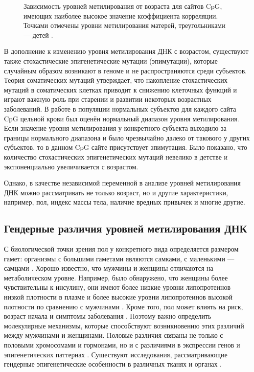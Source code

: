 \begin{figure}[ht]
	\caption{Зависимость уровней метилирования от возраста для сайтов CpG, имеющих наиболее высокое значение коэффициента корреляции. Точками отмечены уровни метилирования матерей, треугольниками --- детей \autocite{Garagnani2012}.}\label{fig:ELOVL2}
\end{figure}

В дополнение к изменению уровня метилирования ДНК с возрастом, существуют также стохастические эпигенетические мутации (эпимутации), которые случайным образом возникают в геноме и не распространяются среди субъектов. Теория соматических мутаций утверждает, что накопление стохастических мутаций в соматических клетках приводит к снижению клеточных функций \autocite{Kennedy2012} и играют важную роль при старении и развитии некоторых возрастных заболеваний. В работе \autocite{Gentilini2015} в популяции нормальных субъектов для каждого сайта CpG цельной крови был оценён нормальный диапазон уровня метилирования. Если значение уровня метилирования у конкретного субъекта выходило за границы нормального диапазона и было чрезвычайно далеко от такового у других субъектов, то в данном CpG сайте присутствует эпимутация. Было показано, что количество стохастических эпигенетических мутаций невелико в детстве и экспоненциально увеличивается с возрастом. 

Однако, в качестве независимой переменной в анализе уровней метилирования ДНК можно рассматривать не только возраст, но и другие характеристики, например, пол, индекс массы тела, наличие вредных привычек и многие другие.

\subsection{Гендерные различия уровней метилирования ДНК}\label{subsec:ch1/sec1/subsec4}

С биологической точки зрения пол у конкретного вида определяется размером гамет: организмы с большими гаметами являются самками, с маленькими --- самцами \autocite{smith1978evolution}. Хорошо известно, что мужчины и женщины отличаются на метаболическом уровне. Например, было обнаружено, что женщины более чувствительны к инсулину, они имеют более низкие уровни липопротеинов низкой плотности в плазме и более высокие уровни липопротеинов высокой плотности по сравнению с мужчинами \autocite{Freedman2004, Magkos2007}. Кроме того, пол может влиять на риск, возраст начала и симптомы заболевания \autocite{Kim2010}. Поэтому важно определить молекулярные механизмы, которые способствуют возникновению этих различий между мужчинами и женщинами. Половые различия связаны не только с половыми хромосомами и гормонами, но и с различиями в экспрессии генов и эпигенетических паттернах \autocite{Mittelstrass2011, Hall2014}. Существуют исследования, рассматривающие гендерные эпигенетические особенности в различных тканях и органах \autocite{Liu2010, Boks2009}. 

